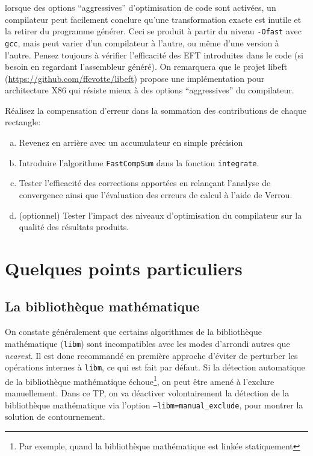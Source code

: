\documentclass[a4paper]{article}
\newcounter{Question}
\newenvironment{question}[1][\unskip]{
  \bigskip
  \stepcounter{Question}
  \def\questionTitle{ #1}
  \begin{mdframed}[style=question]
  }{
  \end{mdframed}
}
\newenvironment{warn}[1][Attention :]{
  \begin{mdframed}[style=warning]
    \noindent{\bf #1}
}{
  \end{mdframed}
}
\begin{document}
\FloatBarrier

\begin{warn}
  lorsque des options ``aggressives'' d'optimisation de code sont activées, un
  compilateur peut facilement conclure qu'une transformation exacte est inutile
  et la retirer du programme générer. Ceci se produit à partir du niveau
  \texttt{-Ofast} avec \texttt{gcc}, mais peut varier d'un compilateur à
  l'autre, ou même d'une version à l'autre. Pensez toujours à vérifier
  l'efficacité des EFT introduites dans le code (si besoin en regardant
  l'assembleur généré). On remarquera que le projet libeft
  (\url{https://github.com/ffevotte/libeft}) propose une
  implémentation pour architecture X86 qui résiste mieux à des options
  ``aggressives'' du compilateur.
  
\end{warn}

\begin{question}
  Réalisez la compensation d'erreur dans la sommation des contributions de
  chaque rectangle:
  \begin{enumerate}[(a)]
  \item Revenez en arrière avec un accumulateur en simple précision
  \item Introduire l'algorithme \texttt{FastCompSum} dans la fonction
    \texttt{integrate}.
  \item Tester l'efficacité des corrections apportées en relançant l'analyse de
    convergence ainsi que l'évaluation des erreurs de calcul à l'aide de Verrou.
  \item (optionnel) Tester l'impact des niveaux d'optimisation du compilateur
    sur la qualité des résultats produits.
  \end{enumerate}
\end{question}



\section{Quelques points particuliers}

\subsection{La bibliothèque mathématique}
\label{ref:libm}

On constate généralement que certains algorithmes de la bibliothèque
mathématique (\texttt{libm}) sont incompatibles avec les modes d'arrondi autres
que \textit{nearest}. Il est donc recommandé en première approche d'éviter
de perturber les opérations internes à \texttt{libm}, ce qui est fait par défaut.
Si la détection automatique de la bibliothèque mathématique
échoue\footnote{Par exemple, quand la bibliothèque mathématique est
linkée statiquement}, on peut être amené à l'exclure 
manuellement. Dans ce TP, on va déactiver volontairement la détection
de la bibliothèque mathématique via l'option
\texttt{--libm=manual\_exclude}, pour montrer la solution de contournement.
\end{document}
